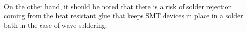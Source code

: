 \begin{itemize}[topsep=4pt,itemsep=2pt,partopsep=2pt, parsep=2pt]
\begin{itemize}[topsep=4pt,itemsep=2pt,partopsep=2pt, parsep=2pt]
        \paragraph{}{ On the other hand, it should be noted that
        there is a risk of solder rejection
        coming from the heat resistant glue that keeps SMT devices in
        place in a solder bath in the case of wave soldering.}

    \end{itemize}

\end{itemize}
